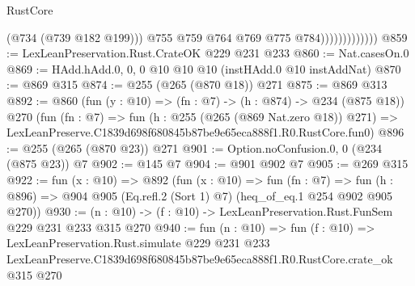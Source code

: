 \begin{lexlean}{RustCore}
\begin{coremodule}
                                (@734 (@739 @182 @199)))
                              @755
                              @759
                              @764
                              @769
                              @775
                              @784)))))))))))))
@859 := LexLeanPreservation.Rust.CrateOK @229 @231 @233
@860 := Nat.casesOn.{0}
@869 := HAdd.hAdd.{0, 0, 0} @10 @10 @10 (instHAdd.{0} @10 instAddNat)
@870 := @869 @315
@874 := @255 (@265 (@870 @18)) @271
@875 := @869 @313
@892 := @860
    (fun (y : @10) => (fn : @7) -> (h : @874) -> @234 (@875 @18))
    @270
    (fun (fn : @7) =>
    fun (h : @255 (@265 (@869 Nat.zero @18)) @271) =>
    LexLeanPreserve.C1839d698f680845b87be9e65eca888f1.R0.RustCore.fun0)
@896 := @255 (@265 (@870 @23)) @271
@901 := Option.noConfusion.{0, 0} (@234 (@875 @23)) @7
@902 := @145 @7
@904 := @901 @902 @7
@905 := @269 @315
@922 := fun (x : @10) =>
  @892
    (fun (x : @10) =>
    fun (fn : @7) =>
    fun (h : @896) => @904 @905 (Eq.refl.{2} (Sort 1) @7) (heq_of_eq.{1} @254 @902 @905 @270))
@930 := (n : @10) -> (f : @10) -> LexLeanPreservation.Rust.FunSem @229 @231 @233 @315 @270
@940 := fun (n : @10) =>
  fun (f : @10) =>
  LexLeanPreservation.Rust.simulate
    @229
    @231
    @233
    LexLeanPreserve.C1839d698f680845b87be9e65eca888f1.R0.RustCore.crate_ok
    @315
    @270
\end{coremodule}
\end{lexlean}
